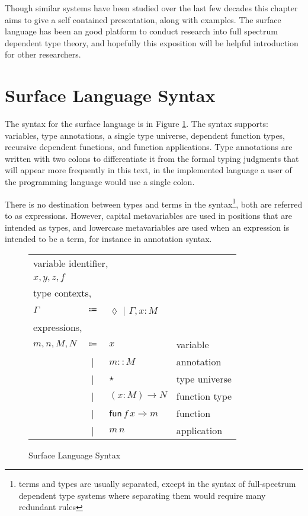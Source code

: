 Though similar systems have been studied over the last few decades this chapter aims to give a self contained presentation, along with examples.
The surface language has been an good platform to conduct research into full spectrum dependent type theory, and hopefully this exposition will be helpful introduction for other researchers.

\section{Surface Language Syntax}


The syntax for the surface language is in Figure \ref{fig:surface-pre-syntax}.
The syntax supports: variables, type annotations, a single type universe, dependent function types, recursive dependent functions, and function applications.
Type annotations are written with two colons to differentiate it from the formal typing judgments that will appear more frequently in this text, in the implemented language a user of the programming language would use a single colon.


There is no destination between types and terms in the syntax\footnote{terms and types are usually separated, except in the syntax of full-spectrum dependent type systems where separating them would require many redundant rules}, both are referred to as expressions.
However, capital metavariables are used in positions that are intended as types, and lowercase metavariables are used when an expression is intended to be a term, for instance in annotation syntax.






\begin{figure}
  \begin{tabular}{lcll}
  \multicolumn{4}{l}{variable identifier,}\tabularnewline
  \multicolumn{4}{l}{$x,y,z,f$}\tabularnewline
  \multicolumn{4}{l}{type contexts,}\tabularnewline
  $\Gamma$ & $\Coloneqq$ & $\lozenge$ | $\Gamma,x:M$ & \tabularnewline
  \multicolumn{4}{l}{expressions,}\tabularnewline
  $m,n,M,N$ & $\Coloneqq$ & $x$ & variable\tabularnewline
   & | & $m::M$ & annotation\tabularnewline
   & | & $\star$ & type universe\tabularnewline
   & | & $\left(x:M\right)\rightarrow N$ & function type\tabularnewline
   & | & $\mathsf{fun}\,f\,x\Rightarrow m$ & function\tabularnewline
   & | & $m\,n$ & application\tabularnewline
  \end{tabular}\caption{Surface Language Syntax}
  \label{fig:surface-pre-syntax}
  \end{figure}
  
